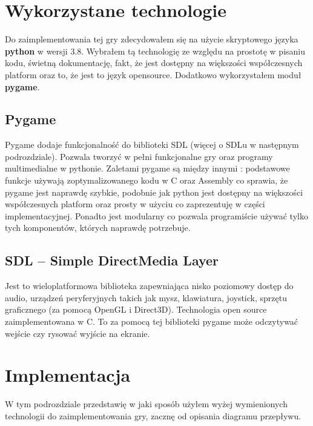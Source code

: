 \documentclass[a4paper,12pt,oneside]{book}
\begin{document}
\section{Wykorzystane technologie}
Do zaimplementowania tej gry zdecydowałem się na użycie skryptowego języka
\textbf{python} w wersji 3.8. Wybrałem tą technologię ze względu na prostotę w
pisaniu kodu, świetną dokumentację, fakt, że jest dostępny na większości
współczesnych platform oraz to, że jest to język open\dywiz source.
Dodatkowo wykorzystałem moduł \textbf{pygame}.
\subsection{Pygame}
Pygame dodaje funkcjonalność do biblioteki SDL (więcej o SDLu w następnym podrozdziale).
Pozwala tworzyć w pełni funkcjonalne gry oraz programy multimedialne w pythonie.
Zaletami pygame są między innymi : podstawowe funkcje używają zoptymalizowanego kodu
w C oraz Assembly co sprawia, że pygame jest naprawdę szybkie, podobnie jak python jest
dostępny na większości współczesnych platform oraz prosty w użyciu co zaprezentuję
w części implementacyjnej. Ponadto jest modularny co pozwala programiście używać
tylko tych komponentów, których naprawdę potrzebuje.
\subsection{SDL -- Simple DirectMedia Layer}
Jest to wieloplatformowa biblioteka zapewniająca nisko poziomowy dostęp do audio,
urządzeń peryferyjnych takich jak mysz, klawiatura, joystick, sprzętu graficznego 
(za pomocą OpenGL i Direct3D). Technologia open source zaimplementowana w C.
To za pomocą tej biblioteki pygame może odczytywać wejście czy rysować wyjście 
na ekranie.
\section{Implementacja}
W tym podrozdziale przedstawię w jaki sposób użyłem wyżej wymienionych technologii
do zaimplementowania gry, zacznę od opisania diagramu przepływu.
\end{document}
